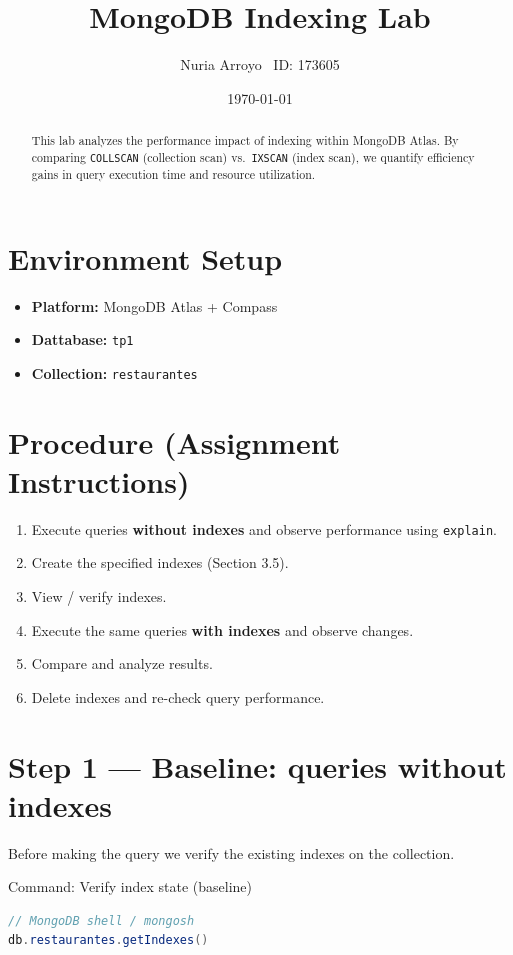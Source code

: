 \documentclass[11pt, letterpaper]{article}
\title{\vspace{-1.2cm}\sffamily\Huge\bfseries MongoDB Indexing Lab}
\author{\sffamily Nuria Arroyo \textbullet\ ID: 173605}
\date{\sffamily \today}
\begin{document}
\maketitle

\begin{abstract}
\noindent
This lab analyzes the performance impact of indexing within MongoDB Atlas.
By comparing \texttt{COLLSCAN} (collection scan) vs.\ \texttt{IXSCAN} (index scan),
we quantify efficiency gains in query execution time and resource utilization.
\end{abstract}

\section{Environment Setup}
\begin{itemize}[label=\textcolor{brandblue}{\checkmark}]
    \item \textbf{Platform:} MongoDB Atlas + Compass
    \item \textbf{Dattabase:} \texttt{tp1}
    \item \textbf{Collection:} \texttt{restaurantes}
\end{itemize}

\section{Procedure (Assignment Instructions)}
\begin{enumerate}
  \item Execute queries \textbf{without indexes} and observe performance using \texttt{explain}.
  \item Create the specified indexes (Section 3.5).
  \item View / verify indexes.
  \item Execute the same queries \textbf{with indexes} and observe changes.
  \item Compare and analyze results.
  \item Delete indexes and re-check query performance.
\end{enumerate}
\newpage

\section{Step 1 — Baseline: queries without indexes}
Before making the query we verify the existing indexes on the collection.

\begin{labstep}{Command: Verify index state (baseline)}
\begin{lstlisting}[language=Java]
// MongoDB shell / mongosh
db.restaurantes.getIndexes()
\end{lstlisting}
\end{labstep}
\end{document}
